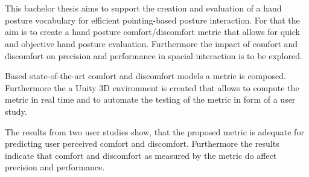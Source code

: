 \chapter{\abstractname}

This bachelor thesis aims to support the creation and evaluation of a hand posture vocabulary for efficient pointing-based posture interaction. For that the aim is to create a hand posture comfort/discomfort metric that allows for quick and objective hand posture evaluation. Furthermore the impact of comfort and discomfort on precision and performance in spacial interaction is to be explored.

Based state-of-the-art comfort and discomfort models a metric is composed. Furthermore the a Unity 3D environment is created that allows to compute the metric in real time and to automate the testing of the metric in form of a user study. 

The results from two user studies show, that the proposed metric is adequate for predicting user perceived comfort and discomfort. Furthermore the results indicate that comfort and discomfort as measured by the metric do affect precision and performance.